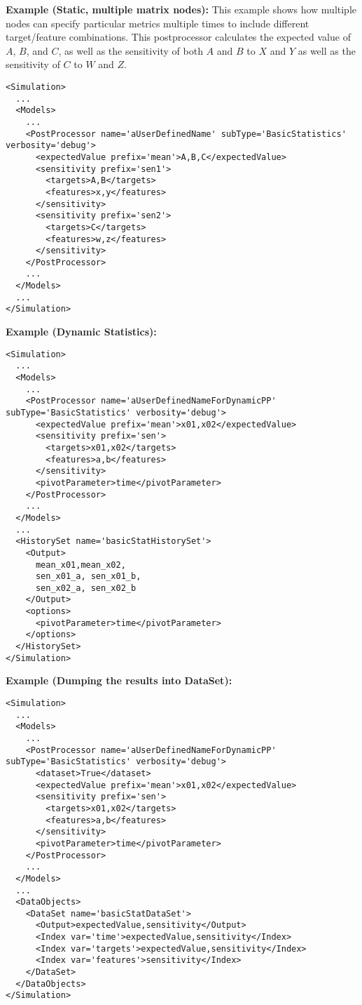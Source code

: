 \textbf{Example (Static, multiple matrix nodes):} This example shows how multiple nodes can specify
particular metrics multiple times to include different target/feature combinations.  This postprocessor
calculates the expected value of $A$, $B$, and $C$, as well as the sensitivity of both $A$ and $B$ to $X$ and
$Y$ as well as the sensitivity of $C$ to $W$ and $Z$.
\begin{lstlisting}[style=XML,morekeywords={name,subType,debug}]
<Simulation>
  ...
  <Models>
    ...
    <PostProcessor name='aUserDefinedName' subType='BasicStatistics' verbosity='debug'>
      <expectedValue prefix='mean'>A,B,C</expectedValue>
      <sensitivity prefix='sen1'>
        <targets>A,B</targets>
        <features>x,y</features>
      </sensitivity>
      <sensitivity prefix='sen2'>
        <targets>C</targets>
        <features>w,z</features>
      </sensitivity>
    </PostProcessor>
    ...
  </Models>
  ...
</Simulation>
\end{lstlisting}
\textbf{Example (Dynamic Statistics):}
\begin{lstlisting}[style=XML,morekeywords={name,subType,debug}]
<Simulation>
  ...
  <Models>
    ...
    <PostProcessor name='aUserDefinedNameForDynamicPP' subType='BasicStatistics' verbosity='debug'>
      <expectedValue prefix='mean'>x01,x02</expectedValue>
      <sensitivity prefix='sen'>
        <targets>x01,x02</targets>
        <features>a,b</features>
      </sensitivity>
      <pivotParameter>time</pivotParameter>
    </PostProcessor>
    ...
  </Models>
  ...
  <HistorySet name='basicStatHistorySet'>
    <Output>
      mean_x01,mean_x02,
      sen_x01_a, sen_x01_b,
      sen_x02_a, sen_x02_b
    </Output>
    <options>
      <pivotParameter>time</pivotParameter>
    </options>
  </HistorySet>
</Simulation>
\end{lstlisting}

\textbf{Example (Dumping the results into DataSet):}
\begin{lstlisting}[style=XML,morekeywords={name,subType,debug}]
<Simulation>
  ...
  <Models>
    ...
    <PostProcessor name='aUserDefinedNameForDynamicPP' subType='BasicStatistics' verbosity='debug'>
      <dataset>True</dataset>
      <expectedValue prefix='mean'>x01,x02</expectedValue>
      <sensitivity prefix='sen'>
        <targets>x01,x02</targets>
        <features>a,b</features>
      </sensitivity>
      <pivotParameter>time</pivotParameter>
    </PostProcessor>
    ...
  </Models>
  ...
  <DataObjects>
    <DataSet name='basicStatDataSet'>
      <Output>expectedValue,sensitivity</Output>
      <Index var='time'>expectedValue,sensitivity</Index>
      <Index var='targets'>expectedValue,sensitivity</Index>
      <Index var='features'>sensitivity</Index>
    </DataSet>
  </DataObjects>
</Simulation>
\end{lstlisting}
